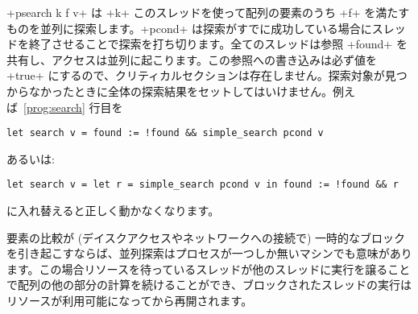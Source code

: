 \begin{example}
\ml+psearch k f v+ は \ml+k+ このスレッドを使って配列の要素のうち \ml+f+ を満たすものを並列に探索します。\ml+pcond+ は探索がすでに成功している場合にスレッドを終了させることで探索を打ち切ります。全てのスレッドは参照 \ml+found+ を共有し、アクセスは並列に起こります。この参照への書き込みは必ず値を \ml+true+ にするので、クリティカルセクションは存在しません。探索対象が見つからなかったときに全体の探索結果をセットしてはいけません。例えば~\ref{prog:search} 行目を
%
\begin{lstlisting}
let search v = found := !found && simple_search pcond v
\end{lstlisting}
%
あるいは:
%
\begin{lstlisting}
let search v = let r = simple_search pcond v in found := !found && r
\end{lstlisting}
%
に入れ替えると正しく動かなくなります。
\end{example}
要素の比較が (デイスクアクセスやネットワークへの接続で) 一時的なブロックを引き起こすならば、並列探索はプロセスが一つしか無いマシンでも意味があります。この場合リソースを待っているスレッドが他のスレッドに実行を譲ることで配列の他の部分の計算を続けることができ、ブロックされたスレッドの実行はリソースが利用可能になってから再開されます。

